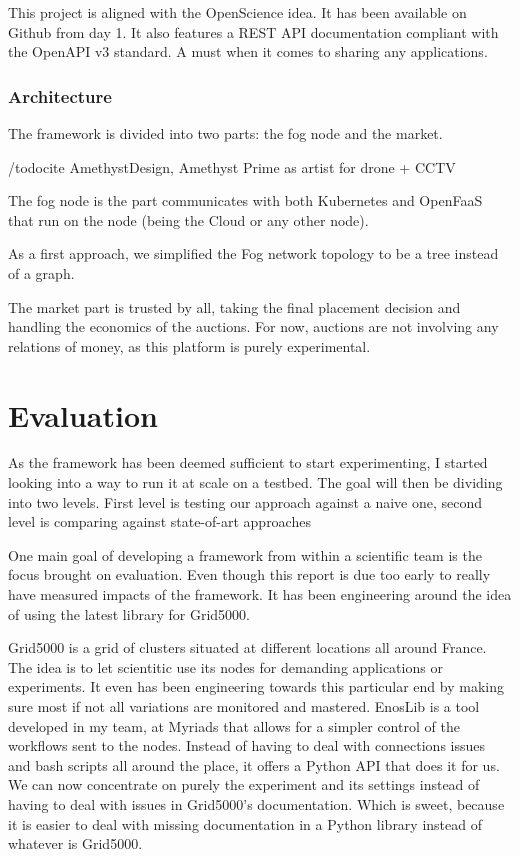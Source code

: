 \documentclass[11pt]{sdm}
\begin{document}
This project is aligned with the OpenScience idea. It has been available on Github from day 1. It also features a REST API documentation compliant with the OpenAPI v3 standard. A must when it comes to sharing any applications.

\subsubsection{Architecture}

The framework is divided into two parts: the fog node and the market. 

/todo{cite AmethystDesign, Amethyst Prime as artist for drone + CCTV}

The fog node is the part communicates with both Kubernetes and OpenFaaS that run on the node (being the Cloud or any other node).

As a first approach, we simplified the Fog network topology to be a tree instead of a graph. 

The market part is trusted by all, taking the final placement decision and handling the economics of the auctions. For now, auctions are not involving any relations of money, as this platform is purely experimental.


\section{Evaluation}

As the framework has been deemed sufficient to start experimenting, I started looking into a way to run it at scale on a testbed. The goal will then be dividing into two levels. First level is testing our approach against a naive one, second level is comparing against state-of-art approaches \cite{bermbach_auctionwhisk_2021, tasiopoulos_fogspot_2019}

One main goal of developing a framework from within a scientific team is the focus brought on evaluation. Even though this report is due too early to really have measured impacts of the framework. It has been engineering around the idea of using the latest library for Grid5000.

Grid5000 is a grid of clusters situated at different locations all around France. The idea is to let scientitic use its nodes for demanding applications or experiments. It even has been engineering towards this particular end by making sure most if not all variations are monitored and mastered. EnosLib is a tool developed in my team, at Myriads that allows for a simpler control of the workflows sent to the nodes. Instead of having to deal with connections issues and bash scripts all around the place, it offers a Python API that does it for us. We can now concentrate on purely the experiment and its settings instead of having to deal with issues in Grid5000's documentation. Which is sweet, because it is easier to deal with missing documentation in a Python library instead of whatever is Grid5000.
\end{document}
